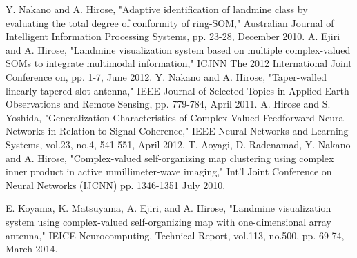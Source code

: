 ﻿\documentclass[12pt,oneside]{jsbook}
\begin{document}
\begin{thebibliography}{99}
 Y. Nakano and A. Hirose, "Adaptive identification of
        landmine class by evaluating the total degree of conformity of
        ring-SOM," Australian Journal of Intelligent Information
        Processing Systems, pp. 23-28, December 2010.
 A. Ejiri and A. Hirose, "Landmine visualization
        system based on multiple complex-valued SOMs to integrate
        multimodal information," ICJNN The 2012 International Joint
        Conference on, pp. 1-7, June 2012.
 Y. Nakano and A. Hirose, "Taper-walled linearly
        tapered slot antenna," IEEE Journal of Selected Topics in
        Applied Earth Observations and Remote Sensing, pp. 779-784, 
        April 2011.
 A. Hirose and S. Yoshida, "Generalization
        Characteristics of Complex-Valued Feedforward Neural Networks in
        Relation to Signal Coherence," IEEE Neural Networks and Learning
        Systems, vol.23, no.4, 541-551, April 2012.
 T. Aoyagi, D. Radenamad, Y. Nakano and A. Hirose,
        "Complex-valued self-organizing map clustering using complex
        inner product in active mmillimeter-wave imaging," Int'l Joint
        Conference on Neural Networks (IJCNN) pp. 1346-1351 July 2010.
\end{thebibliography}
\renewcommand{\bibname}{発表文献}
\begin{thebibliography}{9}
 E. Koyama, K. Matsuyama, A. Ejiri, and
        A. Hirose, "Landmine visualization system using complex-valued
        self-organizing map with one-dimensional array antenna," IEICE
        Neurocomputing, Technical Report, vol.113, no.500, 
        pp. 69-74, March 2014.
\end{thebibliography}
\end{document}

